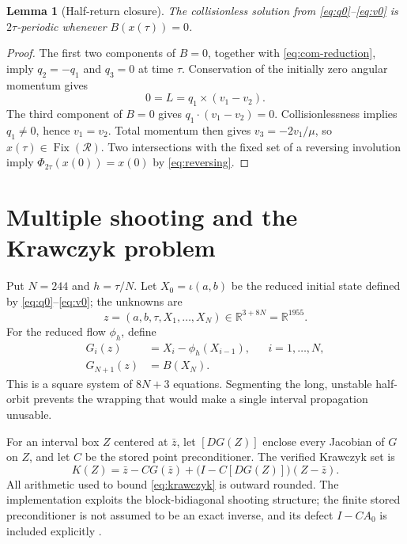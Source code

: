\documentclass[11pt]{article}
\newtheorem{lemma}[theorem]{Lemma}
\newcommand{\R}{\mathbb{R}}
\newcommand{\PhiFlow}{\Phi}
\newcommand{\cross}{\mathbin{\times}}
\begin{document}
\begin{lemma}[Half-return closure]\label{lem:closure}
The collisionless solution from \eqref{eq:q0}--\eqref{eq:v0} is $2\tau$-periodic whenever $B(x(\tau))=0$.
\end{lemma}

\begin{proof}
The first two components of $B=0$, together with \eqref{eq:com-reduction}, imply $q_2=-q_1$ and $q_3=0$ at time $\tau$. Conservation of the initially zero angular momentum gives
\[
  0=L=q_1\cross(v_1-v_2).
\]
The third component of $B=0$ gives $q_1\cdot(v_1-v_2)=0$. Collisionlessness implies $q_1\ne0$, hence $v_1=v_2$. Total momentum then gives $v_3=-2v_1/\mu$, so $x(\tau)\in\operatorname{Fix}(\mathcal R)$. Two intersections with the fixed set of a reversing involution imply
$\PhiFlow_{2\tau}(x(0))=x(0)$ by \eqref{eq:reversing}.
\end{proof}

\section{Multiple shooting and the Krawczyk problem}

Put $N=244$ and $h=\tau/N$. Let $X_0=\iota(a,b)$ be the reduced initial state defined by \eqref{eq:q0}--\eqref{eq:v0}; the unknowns are
\begin{equation}
  z=(a,b,\tau,X_1,\ldots,X_N)\in\R^{3+8N}=\R^{1955}. \label{eq:unknowns}
\end{equation}
For the reduced flow $\phi_h$, define
\begin{align}
  G_i(z)&=X_i-\phi_h(X_{i-1}), && i=1,\ldots,N,\\
  G_{N+1}(z)&=B(X_N). \label{eq:shooting}
\end{align}
This is a square system of $8N+3$ equations. Segmenting the long, unstable half-orbit prevents the wrapping that would make a single interval propagation unusable.

For an interval box $Z$ centered at $\bar z$, let $[DG(Z)]$ enclose every Jacobian of $G$ on $Z$, and let $C$ be the stored point preconditioner. The verified Krawczyk set is
\begin{equation}
  K(Z)=\bar z-CG(\bar z)+\bigl(I-C[DG(Z)]\bigr)(Z-\bar z). \label{eq:krawczyk}
\end{equation}
All arithmetic used to bound \eqref{eq:krawczyk} is outward rounded. The implementation exploits the block-bidiagonal shooting structure; the finite stored preconditioner is not assumed to be an exact inverse, and its defect $I-CA_0$ is included explicitly \cite{krawczyk-1969}.
\end{document}
